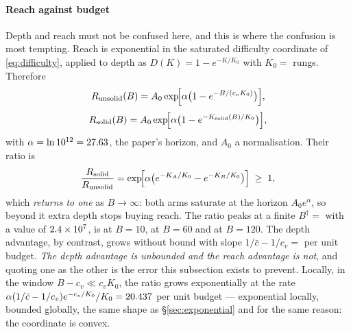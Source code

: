 \documentclass[conference]{IEEEtran}
\theoremstyle{definition}
\begin{document}
\paragraph{Reach against budget} Depth and reach must not be confused here, and this
is where the confusion is most tempting. Reach is exponential in the saturated
difficulty coordinate of \eqref{eq:difficulty}, applied to depth as
$D(K)=1-e^{-K/K_0}$ with $K_0=$\cbKnot{} rungs. Therefore
\begin{equation}
R_{\text{unsolid}}(B)=A_0\exp\!\Bigl[\alpha\bigl(1-e^{-B/(c_vK_0)}\bigr)\Bigr],
\label{eq:cbreach-a}
\end{equation}
\begin{equation}
R_{\text{solid}}(B)=A_0\exp\!\Bigl[\alpha\bigl(1-e^{-K_{\text{solid}}(B)/K_0}\bigr)\Bigr],
\label{eq:cbreach-b}
\end{equation}
with $\alpha=\ln 10^{12}=27.63$, the paper's horizon, and $A_0$ a
normalisation. Their ratio is
\begin{equation}
\frac{R_{\text{solid}}}{R_{\text{unsolid}}}
=\exp\!\Bigl[\alpha\bigl(e^{-K_A/K_0}-e^{-K_B/K_0}\bigr)\Bigr]\;\ge\;1,
\label{eq:cbratio}
\end{equation}
which \emph{returns to one} as $B\to\infty$: both arms saturate at the horizon
$A_0e^{\alpha}$, so beyond it extra depth stops buying reach. The ratio peaks at a
finite $B^\dagger=$\cbPeakBudget{} with a value of
$2.4\times10^{7}$, is \cbSlopeAtTen{} at $B=10$, \cbSlopeAtSixty{}
at $B=60$ and \cbSlopeAtHundred{} at $B=120$. The depth advantage, by contrast, grows
without bound with slope $1/\bar c-1/c_v=$\cbDepthSlope{} per unit budget. \emph{The
depth advantage is unbounded and the reach advantage is not}, and quoting one as the
other is the error this subsection exists to prevent. Locally, in the window
$B-c_v\ll c_vK_0$, the ratio grows exponentially at the rate
$\alpha(1/\bar c-1/c_v)e^{-c_v/K_0}/K_0=20.437$ per unit budget ---
exponential locally, bounded globally, the same shape as \S\ref{sec:exponential} and
for the same reason: the coordinate is convex.

\begin{table}[t]
\centering
\caption{Experiment J. The critical budget against the fixed premium $S$: closed
form \eqref{eq:cbstar}, the estimate obtained by drawing the per-rung price from the
stated process and solving the crossing, both with and without whole-rung
granularity, and the depth gain at a fixed budget of ten. $c_v=1$, $c_c=0.01$,
$\rho=0.1$, $c_d=0$, so the predicted slope is $G_\infty/(G_\infty-1)=$\cbSlopePredicted
and the intercept is the price of one crossing.}
\label{tab:criticalbudget}
\footnotesize

\end{table}
\end{document}
